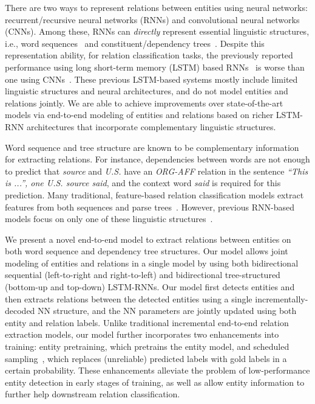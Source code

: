 \documentclass[11pt]{article}
\begin{document}
There are two ways to represent relations between entities using neural networks: 
recurrent/recursive neural networks (RNNs) and convolutional neural networks (CNNs). 
Among these, RNNs can {\it directly} represent essential linguistic structures, i.e., word sequences~\cite{hammerton2001clause} and constituent/dependency trees~\cite{tai-socher-manning:2015:ACL-IJCNLP}. Despite this representation ability, for relation classification tasks, the previously reported performance using long short-term memory (LSTM) based RNNs~\cite{xu-EtAl:2015:EMNLP2,li-EtAl:2015:EMNLP5} is worse than one using CNNs~\cite{dossantos-xiang-zhou:2015:ACL-IJCNLP}. These previous LSTM-based systems mostly include limited linguistic structures and neural architectures, and do not model entities and relations jointly. We are able to achieve improvements over state-of-the-art models via end-to-end modeling of entities and relations based on richer LSTM-RNN architectures that incorporate complementary linguistic structures. 

Word sequence and tree structure are known to be complementary information for extracting relations. 
For instance, dependencies between words are not enough to predict that {\it source} and {\it U.S.} have an {\it ORG-AFF} relation in the sentence {\it ``This is ...'', one U.S. source said}, and the context word {\it said} is required for this prediction. 
Many traditional, feature-based relation classification models extract features from both sequences and parse trees~\cite{zhou-EtAl:2005:ACL}. 
However, previous RNN-based models focus on only one of these linguistic structures~\cite{socher-EtAl:2012:EMNLP-CoNLL}. 

We present a novel end-to-end model to extract relations between entities on both word sequence and dependency tree structures. Our model allows joint modeling of entities and relations in a single model by using both bidirectional sequential (left-to-right and right-to-left) and bidirectional tree-structured (bottom-up and top-down) LSTM-RNNs. 
Our model first detects entities and then extracts relations between the detected entities using a single incrementally-decoded NN structure, and the NN parameters are jointly updated using both entity and relation labels. 
Unlike traditional incremental end-to-end relation extraction models, our model further incorporates two enhancements into training: entity pretraining, which pretrains the entity model, and scheduled sampling~\cite{bengio2015scheduled}, which replaces (unreliable) predicted labels with gold labels in a certain probability. These enhancements alleviate the problem of low-performance entity detection in early stages of training, as well as allow entity information to further help downstream relation classification.
\end{document}
